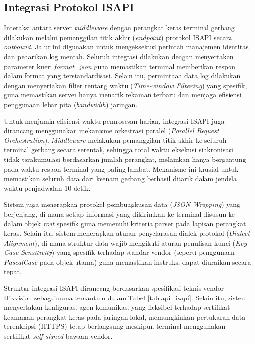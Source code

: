 

\subsection{Integrasi Protokol ISAPI}
Interaksi antara server \textit{middleware} dengan perangkat keras terminal gerbang dilakukan melalui pemanggilan titik akhir (\textit{endpoint}) protokol ISAPI secara \textit{outbound}. Jalur ini digunakan untuk mengeksekusi perintah manajemen identitas dan penarikan log mentah. Seluruh integrasi dilakukan dengan menyertakan parameter kueri \textit{format=json} guna memastikan terminal memberikan respon dalam format yang terstandardisasi. Selain itu, permintaan data log dilakukan dengan menyertakan filter rentang waktu (\textit{Time-window Filtering}) yang spesifik, guna memastikan server hanya menarik rekaman terbaru dan menjaga efisiensi penggunaan lebar pita (\textit{bandwidth}) jaringan. 

Untuk menjamin efisiensi waktu pemrosesan harian, integrasi ISAPI juga dirancang menggunakan mekanisme orkestrasi paralel (\textit{Parallel Request Orchestration}). \textit{Middleware} melakukan pemanggilan titik akhir ke seluruh terminal gerbang secara serentak, sehingga total waktu eksekusi sinkronisasi tidak terakumulasi berdasarkan jumlah perangkat, melainkan hanya bergantung pada waktu respon terminal yang paling lambat. Mekanisme ini krusial untuk memastikan seluruh data dari keenam gerbang berhasil ditarik dalam jendela waktu penjadwalan 10 detik. 

Sistem juga menerapkan protokol pembungkusan data (\textit{JSON Wrapping}) yang berjenjang, di mana setiap informasi yang dikirimkan ke terminal disusun ke dalam objek \textit{root} spesifik guna memenuhi kriteria parser pada lapisan perangkat keras. Selain itu, sistem menerapkan aturan penyelarasan dialek protokol (\textit{Dialect Alignment}), di mana struktur data wajib mengikuti aturan penulisan kunci (\textit{Key Case-Sensitivity}) yang spesifik terhadap standar vendor (seperti penggunaan \textit{PascalCase} pada objek utama) guna memastikan instruksi dapat diuraikan secara tepat. 

Struktur integrasi ISAPI dirancang berdasarkan spesifikasi teknis vendor Hikvision sebagaimana tercantum dalam Tabel \ref{tab:api_isapi}. Selain itu, sistem menyertakan konfigurasi agen komunikasi yang fleksibel terhadap sertifikat keamanan perangkat keras pada jaringan lokal, memungkinkan pertukaran data terenkripsi (HTTPS) tetap berlangsung meskipun terminal menggunakan sertifikat \textit{self-signed} bawaan vendor.


